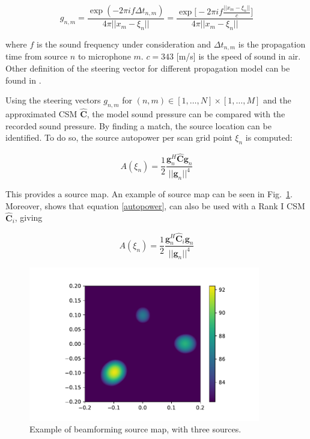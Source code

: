 \documentclass[11pt,a4paper,twoside]{report}
\begin{document}
\begin{equation}
    g_{n,m} = \frac{\exp(-2 \pi i f \Delta t_{n,m})}{4\pi ||x_m -\xi_n||}
    = \frac{\exp \biggl[ -2 \pi i f \frac{||x_m -\xi_n||}{c} \biggr] }{4\pi ||x_m -\xi_n||}  
\end{equation}


where $f$ is the sound frequency under consideration and $\Delta t_{n,m}$ is the propagation time from source $n$ to microphone $m$. $c = 343$ [m/s] is the speed of sound in air. Other definition of the steering vector for different propagation model can be found in \cite{sarradj2012three}.

Using the steering vectors $g_{n,m}$ for $(n,m) \in [1, \dots, N] \times [1, \dots, M]$ and the approximated CSM $\hat{\mathbf{C}}$, the model sound pressure can be compared with the recorded sound pressure. By finding a match, the source location can be identified. To do so, the source autopower per scan grid point $\xi_n$ is computed:

\begin{equation}
    \label{autopower}
    A(\xi_n) = \frac{1}{2} \frac{\mathbf{g}_{n}^H \hat{\mathbf{C}} \mathbf{g}_{n}}{||\mathbf{g}_{n}||^4}
\end{equation}

This provides a source map. An example of source map can be seen in Fig.~\ref{fig:beamforming_example}. Moreover, \cite{sarradj2010fast} shows that equation \ref{autopower}, can also be used with a Rank I CSM $\hat{\mathbf{C}}_i$, giving

\begin{equation}
    A(\xi_n) = \frac{1}{2} \frac{\mathbf{g}_{n}^H \hat{\mathbf{C}}_i \mathbf{g}_{n}}{||\mathbf{g}_{n}||^4}
\end{equation}

\begin{figure}
    \centering
    \includegraphics[width=0.9\textwidth]{figs/beamforming_example.pdf}
    \caption{Example of beamforming source map, with three sources.}
    \label{fig:beamforming_example}    
\end{figure}
\end{document}
